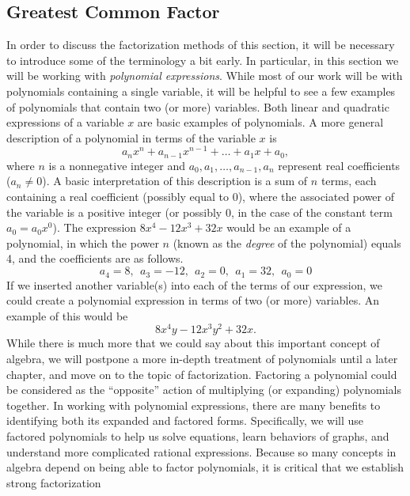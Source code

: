 \subsection{Greatest Common Factor}\pp


{}\pp
In order to discuss the factorization methods of this section, it will be necessary to introduce some of the terminology a bit early.  In particular, in this section we will be working with \textit{polynomial expressions}.  While most of our work will be with polynomials containing a single variable, it will be helpful to see a few examples of polynomials that contain two (or more) variables.\pp
Both linear and quadratic expressions of a variable $x$ are basic examples of polynomials.  A more general description of a polynomial in terms of the variable $x$ is
$$a_nx^n+a_{n-1}x^{n-1}+\ldots+a_1x+a_0,$$
where $n$ is a nonnegative integer and $a_0,a_1,\ldots,a_{n-1},a_n$ represent real coefficients ($a_n\neq 0$).\pp
A basic interpretation of this description is a sum of $n$ terms, each containing a real coefficient (possibly equal to 0), where the associated power of the variable is a positive integer (or possibly 0, in the case of the constant term $a_0=a_0x^0$).\pp
The expression $8 x^4 - 12 x^3 + 32 x$ would be an example of a polynomial, in which the power $n$ (known as the \textit{degree} of the polynomial) equals 4, and the coefficients are as follows.
$$a_4=8,~~a_3=-12,~~a_2=0,~~a_1=32,~~a_0=0$$
If we inserted another variable(s) into each of the terms of our expression, we could create a polynomial expression in terms of two (or more) variables.  An example of this would be $$8 x^4y - 12 x^3y^2 + 32 x.$$
While there is much more that we could say about this important concept of algebra, we will postpone a more in-depth treatment of polynomials until a later chapter, and move on to the topic of factorization.\pp 
Factoring a polynomial could be considered as the ``opposite'' action of multiplying (or expanding) polynomials together.
In working with polynomial expressions, there are many benefits to identifying both its expanded and factored forms.  Specifically, we will use factored polynomials to help us solve equations, learn behaviors of graphs, and understand more complicated rational expressions.  Because so many concepts in algebra depend on being able to factor polynomials, it is critical that we establish strong factorization
